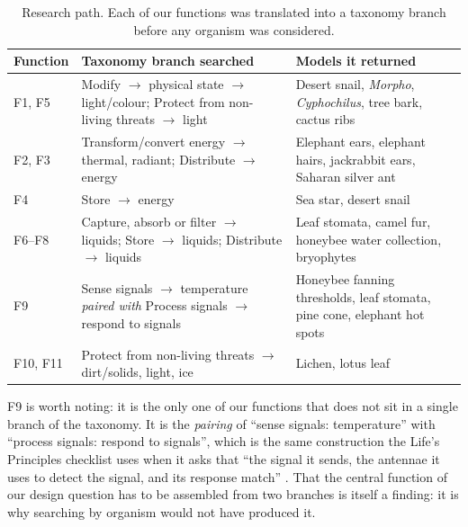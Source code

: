 \begin{table}[htbp]
\centering
\caption{Research path. Each of our functions was translated into a taxonomy
branch before any organism was considered.}
\label{tab:searchpath}
\renewcommand{\arraystretch}{1.25}
\small
\begin{tabularx}{\textwidth}{L{1.6cm} L{5.2cm} X}
\toprule
\textbf{Function} & \textbf{Taxonomy branch searched} & \textbf{Models it returned} \\
\midrule
F1, F5 & Modify $\rightarrow$ physical state $\rightarrow$ light/colour;
         Protect from non-living threats $\rightarrow$ light
       & Desert snail, \emph{Morpho}, \emph{Cyphochilus}, tree bark, cactus ribs \\
F2, F3 & Transform/convert energy $\rightarrow$ thermal, radiant;
         Distribute $\rightarrow$ energy
       & Elephant ears, elephant hairs, jackrabbit ears, Saharan silver ant \\
F4     & Store $\rightarrow$ energy
       & Sea star, desert snail \\
F6--F8 & Capture, absorb or filter $\rightarrow$ liquids; Store $\rightarrow$
         liquids; Distribute $\rightarrow$ liquids
       & Leaf stomata, camel fur, honeybee water collection, bryophytes \\
F9     & Sense signals $\rightarrow$ temperature \emph{paired with}
         Process signals $\rightarrow$ respond to signals
       & Honeybee fanning thresholds, leaf stomata, pine cone, elephant hot spots \\
F10, F11 & Protect from non-living threats $\rightarrow$ dirt/solids, light, ice
       & Lichen, lotus leaf \\
\bottomrule
\end{tabularx}
\end{table}

F9 is worth noting: it is the only one of our functions that does not sit in a
single branch of the taxonomy. It is the \emph{pairing} of \enquote{sense
signals: temperature} with \enquote{process signals: respond to signals}, which
is the same construction the Life's Principles checklist uses when it asks that
\enquote{the signal it sends, the antennae it uses to detect the signal, and its
response match} \parencite{baumeister2014}. That the central function of our
design question has to be assembled from two branches is itself a finding: it is
why searching by organism would not have produced it.

